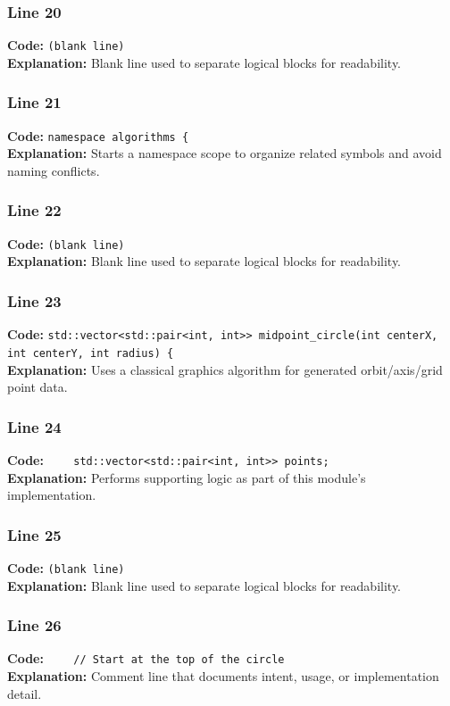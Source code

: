\documentclass[11pt,a4paper]{article}
\begin{document}
\subsubsection*{Line 20}
\textbf{Code:} \texttt{(blank line)}\\
\textbf{Explanation:} Blank line used to separate logical blocks for readability.

\subsubsection*{Line 21}
\textbf{Code:} \verb|namespace algorithms {|\\
\textbf{Explanation:} Starts a namespace scope to organize related symbols and avoid naming conflicts.

\subsubsection*{Line 22}
\textbf{Code:} \texttt{(blank line)}\\
\textbf{Explanation:} Blank line used to separate logical blocks for readability.

\subsubsection*{Line 23}
\textbf{Code:} \verb|std::vector<std::pair<int, int>> midpoint_circle(int centerX, int centerY, int radius) {|\\
\textbf{Explanation:} Uses a classical graphics algorithm for generated orbit/axis/grid point data.

\subsubsection*{Line 24}
\textbf{Code:} \verb|    std::vector<std::pair<int, int>> points;|\\
\textbf{Explanation:} Performs supporting logic as part of this module's implementation.

\subsubsection*{Line 25}
\textbf{Code:} \texttt{(blank line)}\\
\textbf{Explanation:} Blank line used to separate logical blocks for readability.

\subsubsection*{Line 26}
\textbf{Code:} \verb|    // Start at the top of the circle|\\
\textbf{Explanation:} Comment line that documents intent, usage, or implementation detail.
\end{document}
